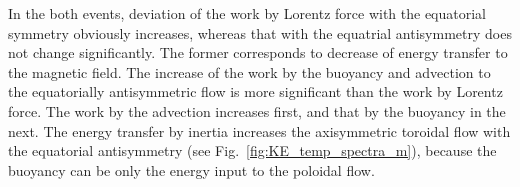 {\color{magenta}
In the both events, deviation of the work by Lorentz force with the equatorial symmetry obviously increases, whereas that with the equatrial antisymmetry does not change significantly.
The former corresponds to decrease of energy transfer to the magnetic field.
The increase of the work by the buoyancy and advection to the equatorially antisymmetric flow is more significant than the work by Lorentz force.
}
The work by the advection increases first, and that by the buoyancy in the next. 
The energy transfer by inertia increases the axisymmetric toroidal flow with the equatorial antisymmetry (see Fig.~\ref{fig:KE_temp_spectra_m}), because the buoyancy can be only the energy input to the poloidal flow.




